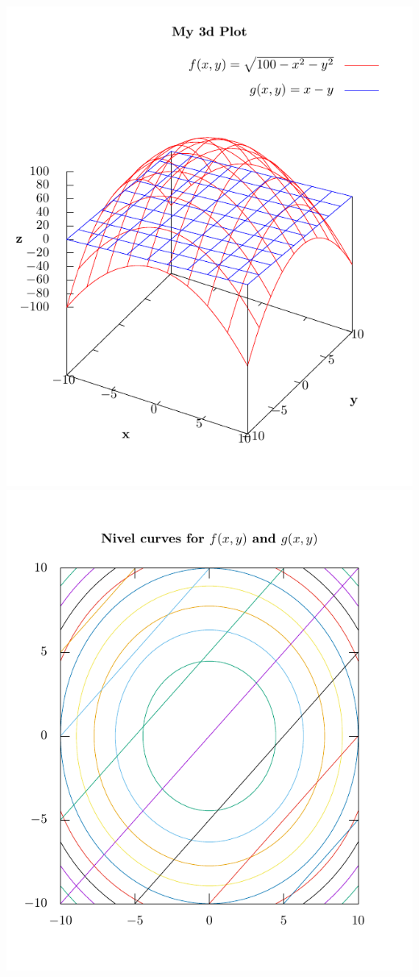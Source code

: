 \documentclass[11.5pt,a4paper]{article}
\begin{document}
\includegraphics[scale=0.70]{ejercicio4.pdf}
\includegraphics[scale=0.70]{ejercicio4a.pdf}
\end{document}

